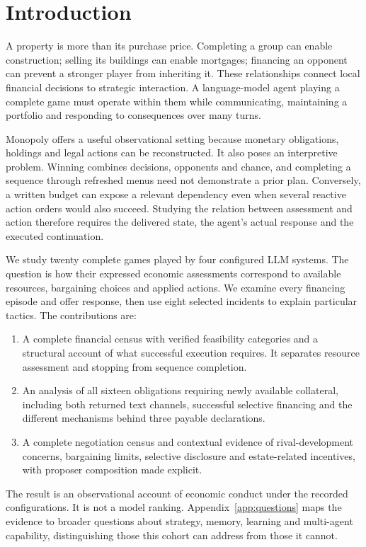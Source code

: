 \section{Introduction}
A property is more than its purchase price. Completing a group can enable construction; selling its buildings can enable mortgages; financing an opponent can prevent a stronger player from inheriting it. These relationships connect local financial decisions to strategic interaction. A language-model agent playing a complete game must operate within them while communicating, maintaining a portfolio and responding to consequences over many turns.

Monopoly offers a useful observational setting because monetary obligations, holdings and legal actions can be reconstructed. It also poses an interpretive problem. Winning combines decisions, opponents and chance, and completing a sequence through refreshed menus need not demonstrate a prior plan. Conversely, a written budget can expose a relevant dependency even when several reactive action orders would also succeed. Studying the relation between assessment and action therefore requires the delivered state, the agent's actual response and the executed continuation.

We study twenty complete games played by four configured LLM systems. The question is how their expressed economic assessments correspond to available resources, bargaining choices and applied actions. We examine every financing episode and offer response, then use eight selected incidents to explain particular tactics. The contributions are:
\begin{enumerate}
\item A complete financial census with verified feasibility categories and a structural account of what successful execution requires. It separates resource assessment and stopping from sequence completion.
\item An analysis of all sixteen obligations requiring newly available collateral, including both returned text channels, successful selective financing and the different mechanisms behind three payable declarations.
\item A complete negotiation census and contextual evidence of rival-development concerns, bargaining limits, selective disclosure and estate-related incentives, with proposer composition made explicit.
\end{enumerate}
The result is an observational account of economic conduct under the recorded configurations. It is not a model ranking. Appendix~\ref{app:questions} maps the evidence to broader questions about strategy, memory, learning and multi-agent capability, distinguishing those this cohort can address from those it cannot.

